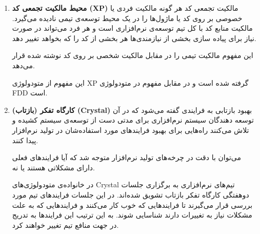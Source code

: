 \begin{enumerate}[i]
\item \textbf{محیط مالکیت تجمعی کد (XP)} \newline
مالکیت تجمعی کد هر گونه مالکیت فردی یا خصوصی بر روی کد یا ماژول‌ها را در یک محیط توسعه‌ی تیمی نادیده می‌گیرد. مالکیت منابع کد با کل تیم توسعه‌ی نرم‌افزاری است و هر فرد می‌تواند در صورت نیاز برای پیاده سازی بخشی از نیازمندی‌ها هر بخشی از کد را که بخواهد تغییر دهد.

این مفهوم مالکیت تیمی را در مقابل مالکیت شخصی بر روی کد نوشته شده قرار می‌دهد.

این مفهوم از متودولوژی XP
 گرفته شده است و در مقابل مفهوم 
در متودولوژی FDD
است.
\cite{code-ownership}

\item \textbf{کارگاه تفکر (بازتاب) (Crystal)} \newline
بهبود بازتابی
به فرایندی گفته می‌شود که در آن توسعه دهندگان سیستم نرم‌افزاری برای مدتی دست از توسعه‌ی سیستم کشیده و تلاش می‌کنند راه‌هایی برای بهبود فرایند‌های مورد استفاده‌شان در تولید نرم‌افزار پیدا کنند.

می‌توان با دقت در چرخه‌های تولید نرم‌افزار متوجه شد که آیا فرایند‌های فعلی دارای مشکلاتی هستند یا نه.

در خانواده‌ی متودولوژی‌های Crystal تیم‌های نرم‌افزاری به برگزاری جلسات دو‌هفتگی کارگاه تفکر بازتاب تشویق شده‌اند. در این جلسات فرایند‌های تیم مورد بررسی قرار می‌گیرند تا فرایند‌هایی که خوب کار می‌کنند و فرایند‌هایی که به علت مشکلات نیاز به تغییرات دارند شناسایی شوند. به این ترتیب این فرایند‌ها به تدریج در جهت منافع تیم تغییر خواهند کرد.
\cite{reflective-workshop}

\end{enumerate}
